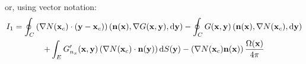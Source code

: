 %
or, using vector notation:
%
\begin{multline}
	I_{1} = 
	\oint_C
	\left( \nabla N({\bf x}_c) \cdot ({\bf y} - {\bf x}_c) \right)
	\left( {\bf n}({\bf x}) , \nabla G({\bf x}, {\bf y}) , \mathrm{d} {\bf y} \right)
	-
	\oint_C
	G({\bf x}, {\bf y})
	\left(
	{\bf n}({\bf x}),
	\nabla N({\bf x}_c),
	\mathrm{d} {\bf y}
	\right)
	\\
	+
	\int_E
	G'_{n_x}({\bf x}, {\bf y})
	\left(\nabla N({\bf x}_c) \cdot {\bf n}({\bf y})\right)
	\mathrm{d} S({\bf y})
	-
	\left( \nabla N({\bf x}_c) {\bf n}({\bf x}) \right) \frac{\Omega({\bf x})}{4\pi}
\end{multline}

